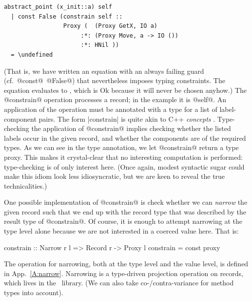 \begin{Verbatim}[fontsize=\small,commandchars=\\\{\}]
 abstract_point (x_init::a) self 
  | const False (constrain self ::
                 Proxy (  (Proxy GetX, IO a)
                      :*: (Proxy Move, a -> IO ())
                      :*: HNil ))
  = \undefined
\end{Verbatim}

\noindent
(That is, we have written an equation with an always failing guard
(cf.\ @const@~@False@) that nevertheless imposes typing constraints.
The equation evaluates to \undefined, which is Ok because it will
never be chosen anyhow.) The @constrain@ operation processes a record;
in the example it is @self@. An application of the operation must be
annotated with a type for a list of label-component pairs.
The form |constrain| is quite akin to C++ \emph{concepts}
\cite{siek05:_concepts_cpp0x}.
Type-checking the application of @constrain@ implies checking whether
the listed labels occur in the given record, and whether the
components are of the required types.  As we can see in the type
annotation, we let @constrain@ return a type proxy. This makes it
crystal-clear that no interesting computation is performed:
type-checking is of only interest here. (Once again, modest syntactic
sugar could make this idiom look less idiosyncratic, but we are keen
to reveal the true technicalities.)

One possible implementation of @constrain@ is check whether we can
\emph{narrow} the given record such that we end up with the record
type that was described by the result type of @constrain@. Of course,
it is enough to attempt narrowing at the type level alone because we
are not interested in a coerced value here. That is:

\begin{code}
 constrain :: Narrow r l => Record r -> Proxy l
 constrain = const proxy
\end{code}

\noindent
The operation for narrowing, both at the type level and the value
level, is defined in App.~\ref{A:narrow}. Narrowing is a type-driven
projection operation on records, which lives in the \HList\
library. (We can also take co-/contra-variance for method types into
account).


 



